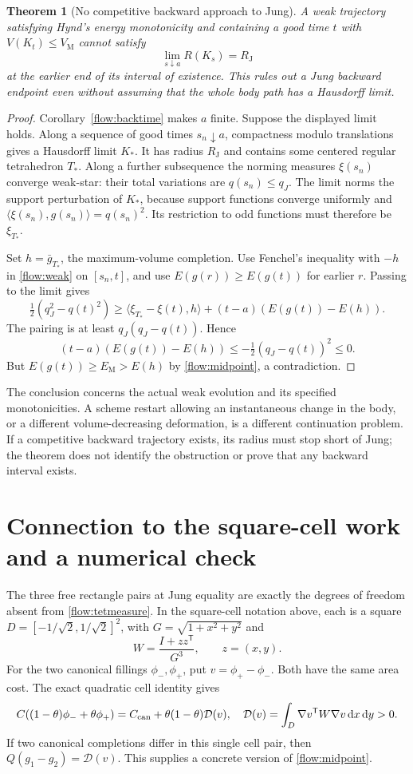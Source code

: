 \documentclass[11pt]{article}
\newtheorem{theorem}{Theorem}[section]
\theoremstyle{remark}\newtheorem{remark}[theorem]{Remark}
\newcommand{\VM}{V_{\mathrm M}}
\newcommand{\RJ}{R_{\mathrm J}}
\newcommand{\EM}{E_{\mathrm M}}
\newcommand{\dd}{\,\mathrm d}
\begin{document}
\begin{theorem}[No competitive backward approach to Jung]\label{flow:nocompetitive}
A weak trajectory satisfying Hynd's energy monotonicity and containing a good time $t$ with $V(K_t)\leq\VM$ cannot satisfy
\[
 \lim_{s\downarrow a}R(K_s)=\RJ
\]
at the earlier end of its interval of existence. This rules out a Jung backward endpoint even without assuming that the whole body path has a Hausdorff limit.
\end{theorem}
\begin{proof}
Corollary~\ref{flow:backtime} makes $a$ finite. Suppose the displayed limit holds. Along a sequence of good times $s_n\downarrow a$, compactness modulo translations gives a Hausdorff limit $K_*$. It has radius $\RJ$ and contains some centered regular tetrahedron $T_*$. Along a further subsequence the norming measures $\xi(s_n)$ converge weak-star: their total variations are $q(s_n)\leq q_J$. The limit norms the support perturbation of $K_*$, because support functions converge uniformly and
$\langle\xi(s_n),g(s_n)\rangle=q(s_n)^2$. Its restriction to odd functions must therefore be $\xi_{T_*}$.

Set $h=\bar g_{T_*}$, the maximum-volume completion. Use Fenchel's inequality with $-h$ in \eqref{flow:weak} on $[s_n,t]$, and use $E(g(r))\geq E(g(t))$ for earlier $r$. Passing to the limit gives
\[
 \tfrac12(q_J^2-q(t)^2)
 \geq\langle\xi_{T_*}-\xi(t),h\rangle
 +(t-a)(E(g(t))-E(h)).
\]
The pairing is at least $q_J(q_J-q(t))$. Hence
\[
 (t-a)(E(g(t))-E(h))\leq-\tfrac12(q_J-q(t))^2\leq0.
\]
But $E(g(t))\geq\EM>E(h)$ by \eqref{flow:midpoint}, a contradiction.
\end{proof}
The conclusion concerns the actual weak evolution and its specified monotonicities. A scheme restart allowing an instantaneous change in the body, or a different volume-decreasing deformation, is a different continuation problem. If a competitive backward trajectory exists, its radius must stop short of Jung; the theorem does not identify the obstruction or prove that any backward interval exists.

\section{Connection to the square-cell work and a numerical check}
The three free rectangle pairs at Jung equality are exactly the degrees of freedom absent from \eqref{flow:tetmeasure}. In the square-cell notation above, each is a square
$D=[-1/\sqrt2,1/\sqrt2]^2$, with $G=\sqrt{1+x^2+y^2}$ and
\[
 W=\frac{I+zz^{\mathsf T}}{G^3},\qquad z=(x,y).
\]
For the two canonical fillings $\phi_-,\phi_+$, put $v=\phi_+-\phi_-$. Both have the same area cost. The exact quadratic cell identity gives
\[
 C((1-\theta)\phi_-+\theta\phi_+)
 =C_{\rm can}+\theta(1-\theta)\mathcal D(v),\quad
 \mathcal D(v)=\int_D\nabla v^{\mathsf T}W\nabla v\dd x\dd y>0.
\]
If two canonical completions differ in this single cell pair, then
$Q(g_1-g_2)=\mathcal D(v)$. This supplies a concrete version of \eqref{flow:midpoint}.
\end{document}
